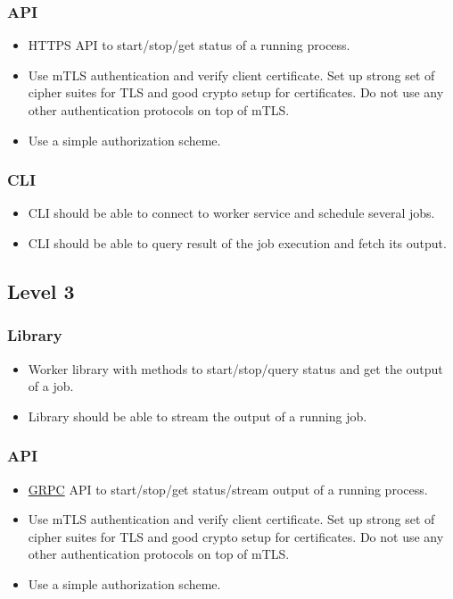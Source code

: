 \documentclass{article}
\begin{document}
  \subsubsection*{API}
  \begin{itemize}
  \item[] HTTPS API to start/stop/get status of a running process.
  \item[] Use mTLS authentication and verify client certificate. Set up strong set of cipher suites for TLS and good crypto setup for certificates. Do not use any other authentication protocols on top of mTLS.
  \item[] Use a simple authorization scheme.
  \end{itemize}

  \subsubsection*{CLI}
  \begin{itemize}
  \item[] CLI should be able to connect to worker service and schedule several jobs.
  \item[] CLI should be able to query result of the job execution and fetch its output.
  \end{itemize}

 \subsection*{Level 3}

  \subsubsection*{Library}
  \begin{itemize}
  \item[] Worker library with methods to start/stop/query status and get the output of a job.
  \item[] Library should be able to stream the output of a running job.
  \end{itemize}

  \subsubsection*{API}
  \begin{itemize}
  \item[] \href{https://grpc.io}{GRPC} API to start/stop/get status/stream output of a running process.
  \item[] Use mTLS authentication and verify client certificate. Set up strong set of cipher suites for TLS and good crypto setup for certificates. Do not use any other authentication protocols on top of mTLS.
  \item[] Use a simple authorization scheme.
  \end{itemize}
\end{document}

